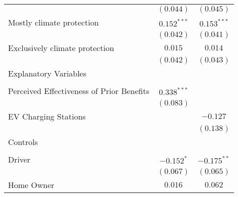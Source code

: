 \begin{center}
\begin{tiny}
\begin{longtable}{l@{} c@{} c@{}}
                                                                                           & $(0.044)$        & $(0.045)$      \\
\quad Mostly climate protection                                                            & $0.152^{***}$    & $0.153^{***}$  \\
                                                                                           & $(0.042)$        & $(0.041)$      \\
\quad Exclusively climate protection                                                       & $0.015$          & $0.014$        \\
                                                                                           & $(0.042)$        & $(0.043)$      \\
Explanatory Variables                                                                      &                  &                \\
                                                                                           &                  &                \\
\quad Perceived Effectiveness of Prior Benefits                                            & $0.338^{***}$    &                \\
                                                                                           & $(0.083)$        &                \\
\quad EV Charging Stations                                                                 &                  & $-0.127$       \\
                                                                                           &                  & $(0.138)$      \\
Controls                                                                                   &                  &                \\
                                                                                           &                  &                \\
\quad Driver                                                                               & $-0.152^{*}$     & $-0.175^{**}$  \\
                                                                                           & $(0.067)$        & $(0.065)$      \\
\quad Home Owner                                                                           & $0.016$          & $0.062$        \\

\end{longtable}
\end{tiny}
\end{center}
